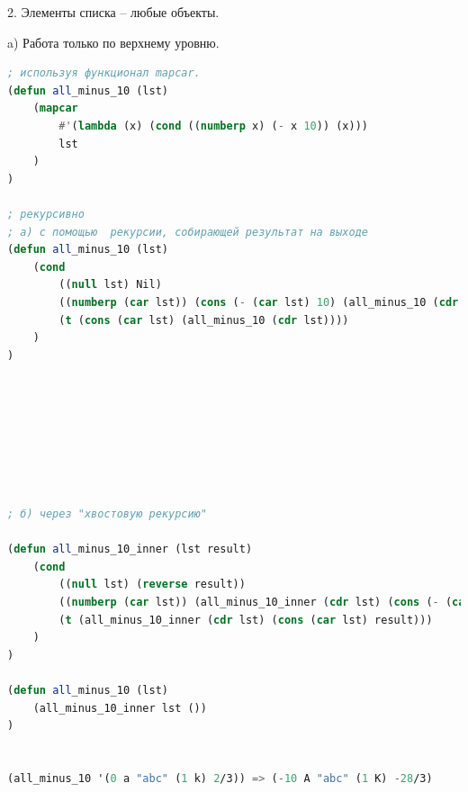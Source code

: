 \documentclass[12pt]{report}
\begin{document}
2. Элементы списка -- любые объекты.

a) Работа только по верхнему уровню. 

\begin{lstlisting}[language=Lisp]
; используя функционал mapcar.
(defun all_minus_10 (lst)
	(mapcar 
		#'(lambda (x) (cond ((numberp x) (- x 10)) (x)))
		lst
	)
)

; рекурсивно
; а) с помощью  рекурсии, собирающей результат на выходе
(defun all_minus_10 (lst)
	(cond 
		((null lst) Nil)
		((numberp (car lst)) (cons (- (car lst) 10) (all_minus_10 (cdr lst))))
		(t (cons (car lst) (all_minus_10 (cdr lst))))
	)
)	








; б) через "хвостовую рекурсию" 

(defun all_minus_10_inner (lst result)
	(cond 
		((null lst) (reverse result))
		((numberp (car lst)) (all_minus_10_inner (cdr lst) (cons (- (car lst) 10) result)))
		(t (all_minus_10_inner (cdr lst) (cons (car lst) result)))
	)
)

(defun all_minus_10 (lst) 
	(all_minus_10_inner lst ())
)


(all_minus_10 '(0 a "abc" (1 k) 2/3)) => (-10 A "abc" (1 K) -28/3)
\end{lstlisting}
\end{document}
